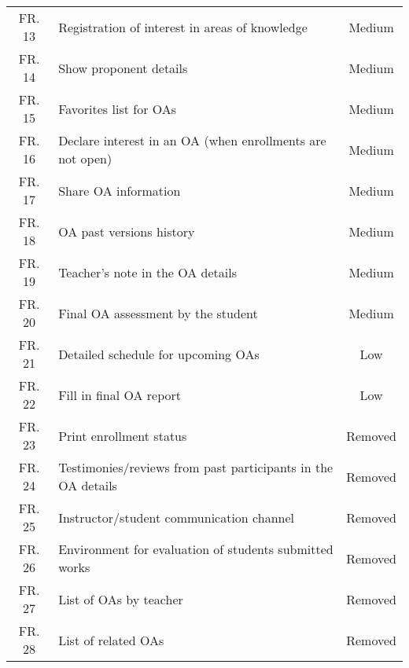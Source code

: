 \begin{table}[!htb]
\begin{tabular}{c|l|c}
    \rowcolor[rgb]{0.898,0.898,0.898} FR. 13      & Registration of interest in areas of knowledge               & Medium            \\
    FR. 14                                        & Show proponent details                                       & Medium            \\
    \rowcolor[rgb]{0.898,0.898,0.898} FR. 15      & Favorites list for OAs                                       & Medium            \\
    FR. 16                                        & Declare interest in an OA (when enrollments are not open)    & Medium            \\
    \rowcolor[rgb]{0.898,0.898,0.898} FR. 17      & Share OA information                                         & Medium            \\
    FR. 18                                        & OA past versions history                                     & Medium            \\
    \rowcolor[rgb]{0.898,0.898,0.898} FR. 19      & Teacher's note in the OA details                             & Medium            \\
    FR. 20                                        & Final OA assessment by the student                           & Medium            \\
    \rowcolor[rgb]{0.898,0.898,0.898} FR. 21      & Detailed schedule for upcoming OAs                           & Low               \\
    FR. 22                                        & Fill in final OA report~                                     & Low               \\
    \rowcolor[rgb]{0.898,0.898,0.898} FR. 23      & Print enrollment status                                      & Removed           \\
    FR. 24                                        & Testimonies/reviews from past participants in the OA details & Removed           \\
    \rowcolor[rgb]{0.898,0.898,0.898} FR. 25      & Instructor/student communication channel                     & Removed           \\
    FR. 26                                        & Environment for evaluation of students submitted works       & Removed           \\
    \rowcolor[rgb]{0.898,0.898,0.898} FR. 27      & List of OAs by teacher                                       & Removed           \\
    FR. 28                                        & List of related OAs                                          & Removed           \\
    \bottomrule
  \end{tabular}
\end{table}
